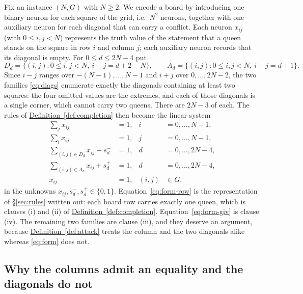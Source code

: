 \documentclass{easychair}
\newcommand{\secref}[1]{\hyperref[#1]{\textcolor{academicpurple}{\S\ref*{#1}}}}
\newcommand{\defref}[1]{\textcolor{academicpurple}{\hyperref[#1]{Definition~\ref*{#1}}}}
\begin{document}
Fix an instance $(N,G)$ with $N \ge 2$. We encode a board by introducing one binary neuron for each
square of the grid, i.e.\ $N^{2}$ neurons, together with one auxiliary neuron for each diagonal that
can carry a conflict. Each neuron $x_{ij}$ (with $0 \le i, j < N$) represents the truth value of the
statement that a queen stands on the square in row $i$ and column $j$; each auxiliary neuron records
that its diagonal is empty. For $0 \le d \le 2N-4$ put
\begin{equation}\label{eq:diags}
  D_d = \{(i,j) : 0 \le i,j < N,\ i - j = d + 2 - N\},
  \qquad
  A_d = \{(i,j) : 0 \le i,j < N,\ i + j = d + 1\} .
\end{equation}
Since $i - j$ ranges over $-(N-1),\dots,N-1$ and $i + j$ over $0,\dots,2N-2$, the two families
\eqref{eq:diags} enumerate exactly the diagonals containing at least two squares: the four omitted
values are the extremes, and each of those diagonals is a single corner, which cannot carry two
queens. There are $2N-3$ of each. The rules of \defref{def:completion} then become the linear system
\begin{subequations}\label{eq:form}
\begin{align}
  \textstyle\sum_{j} x_{ij} &= 1, & i &= 0,\dots,N-1, \label{eq:form-row}\\
  \textstyle\sum_{i} x_{ij} &= 1, & j &= 0,\dots,N-1, \label{eq:form-col}\\
  \textstyle\sum_{(i,j)\in D_d} x_{ij} + s^{-}_{d} &= 1, & d &= 0,\dots,2N-4, \label{eq:form-diag}\\
  \textstyle\sum_{(i,j)\in A_d} x_{ij} + s^{+}_{d} &= 1, & d &= 0,\dots,2N-4, \label{eq:form-anti}\\
  x_{ij} &= 1, & (i,j) &\in G, \label{eq:form-giv}
\end{align}
\end{subequations}
in the unknowns $x_{ij}, s^{-}_{d}, s^{+}_{d} \in \{0,1\}$. Equation~\eqref{eq:form-row} is the
representation of \secref{sec:rules} written out: each board row carries exactly one queen, which is
clauses (i) and (ii) of \defref{def:completion}. Equation~\eqref{eq:form-giv} is clause (iv). The
remaining two families are clause (iii), and they deserve an argument, because
\defref{def:attack} treats the column and the two diagonals alike whereas \eqref{eq:form} does not.

\subsection*{Why the columns admit an equality and the diagonals do not}
\end{document}
